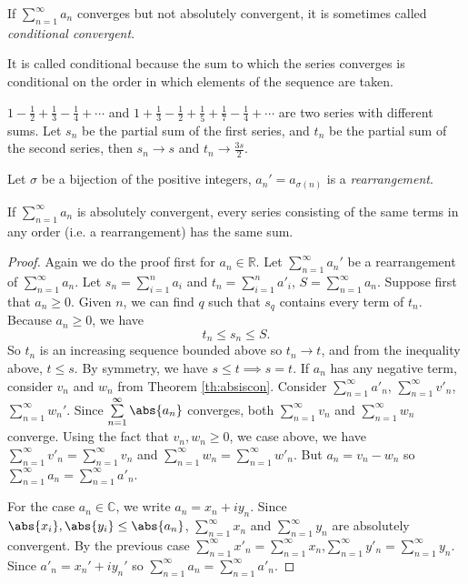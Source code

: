 \begin{notation}
    If \(\sum\limits_{n=1}^{\infty} a_n\) converges but not absolutely convergent, it is sometimes called \textit{conditional convergent}.

    It is called conditional because the sum to which the series converges is conditional on the order in which elements of the sequence are taken.
\end{notation}
\begin{example}
    \(1 - \frac{1}{2} + \frac{1}{3} - \frac{1}{4} + \cdots\) and \(1 + \frac{1}{3}-\frac{1}{2}+\frac{1}{5}+\frac{1}{7}-\frac{1}{4}+\cdots\) are two series with different sums. Let \(s_n\) be the partial sum of the first series, and \(t_n\) be the partial sum of the second series, then \(s_n \to s\) and \(t_n \to \frac{3s}{2}\).
\end{example}
\begin{definition}{}{}
    Let \(\sigma\) be a bijection of the positive integers, \(a_n' = a_{\sigma(n)}\) is a \textit{rearrangement}.
\end{definition}
\begin{theorem}{}{}
    If \(\sum\limits_{n=1}^{\infty} a_n\) is absolutely convergent, every series consisting of the same terms in any order (i.e. a rearrangement) has the same sum.
\end{theorem}
\begin{proof}
    Again we do the proof first for \(a_n \in \mathbb{R}\). Let \(\sum\limits_{n=1}^{\infty} a_n'\) be a rearrangement of \(\sum\limits_{n=1}^{\infty} a_n\). Let \(s_n = \sum\limits_{i=1}^{n} a_i\) and \(t_n = \sum\limits_{i=1}^{n} a'_i\), \(S = \sum\limits_{n=1}^{\infty} a_n\). Suppose first that \(a_n \geq 0\). Given \(n\), we can find \(q\) such that \(s_q\) contains every term of \(t_n\). Because \(a_n \geq 0\), we have
    \[
        t_n \leq s_n \leq S.
    \]
    So \(t_n\) is an increasing sequence bounded above so \(t_n \to t\), and from the inequality above, \(t \leq s\). By symmetry, we have \(s \leq t \implies s = t\).
    If \(a_n\) has any negative term, consider \(v_n\) and \(w_n\) from Theorem \eqref{th:absiscon}. Consider \(\sum\limits_{n=1}^{\infty} a'_n\), \(\sum\limits_{n=1}^{\infty} v'_n\), \(\sum\limits_{n=1}^{\infty} w_n'\). Since \(\sum\limits_{n=1}^{\infty} \abs{a_n}\) converges, both \(\sum\limits_{n=1}^{\infty} v_n\) and \(\sum\limits_{n=1}^{\infty} w_n\) converge. Using the fact that \(v_n, w_n \geq 0\), we case above, we have \(\sum\limits_{n=1}^{\infty} v'_n = \sum\limits_{n=1}^{\infty} v_n\) and \(\sum\limits_{n=1}^{\infty} w_n = \sum\limits_{n=1}^{\infty} w'_n\). But \(a_n = v_n - w_n\) so \(\sum\limits_{n=1}^{\infty} a_n = \sum\limits_{n=1}^{\infty} a'_n\).

    For the case \(a_n \in \mathbb{C}\), we write \(a_n = x_n + iy_n\). Since \(\abs{x_i}, \abs{y_i} \leq \abs{a_n} \), \(\sum\limits_{n=1}^{\infty} x_n\) and \(\sum\limits_{n=1}^{\infty} y_n\) are absolutely convergent. By the previous case \(\sum\limits_{n=1}^{\infty} x'_n = \sum\limits_{n=1}^{\infty} x_n\),\(\sum\limits_{n=1}^{\infty} y'_n = \sum\limits_{n=1}^{\infty} y_n\). Since \(a'_n = x_n' + iy_n'\) so \(\sum\limits_{n=1}^{\infty} a_n = \sum\limits_{n=1}^{\infty} a'_n\).
\end{proof}